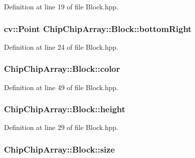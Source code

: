 Definition at line 19 of file Block.\+hpp.

\hypertarget{classChipChipArray_1_1Block_a82f831883d31e6d74be45b8851eefe96}{
\subsubsection[{bottom\+Right}]{\setlength{\rightskip}{0pt plus 5cm}cv\+::\+Point Chip\+Chip\+Array\+::\+Block\+::bottom\+Right}}\label{classChipChipArray_1_1Block_a82f831883d31e6d74be45b8851eefe96}


Definition at line 24 of file Block.\+hpp.

\hypertarget{classChipChipArray_1_1Block_a262210a9a04028f3f2670c9ae38ef3d7}{
\subsubsection[{color}]{ Chip\+Chip\+Array\+::\+Block\+::color}}\label{classChipChipArray_1_1Block_a262210a9a04028f3f2670c9ae38ef3d7}


Definition at line 49 of file Block.\+hpp.

\hypertarget{classChipChipArray_1_1Block_aed94802c166c9b4553764eb637717a2a}{
\subsubsection[{height}]{ Chip\+Chip\+Array\+::\+Block\+::height}}\label{classChipChipArray_1_1Block_aed94802c166c9b4553764eb637717a2a}


Definition at line 29 of file Block.\+hpp.

\hypertarget{classChipChipArray_1_1Block_aebd356d7fcfe7ff11db8195e6d7f8e42}{
\subsubsection[{size}]{ Chip\+Chip\+Array\+::\+Block\+::size}}\label{classChipChipArray_1_1Block_aebd356d7fcfe7ff11db8195e6d7f8e42}


